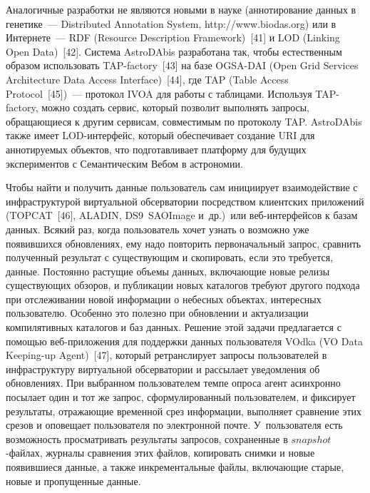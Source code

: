 \begin{multicols}{2}
      Аналогичные разработки не являются новыми в науке (аннотирование данных в 
генетике~--- {Distributed Annotation System}, {\sf http://www.biodas.org}) или в 
Интернете~--- RDF ({Resource Description Framework})~[41] и LOD ({Linking 
Open Data})~[42]. Сис\-те\-ма AstroDAbis разработана так, чтобы естественным образом 
использовать TAP-factory~[43] на базе OGSA-DAI ({Open Grid Services 
Architecture Data Access Interface})~[44], где TAP ({Table Access Protocol}~[45])~--- 
протокол IVOA для работы с таб\-ли\-ца\-ми. Используя TAP-factory, можно создать 
сервис, который позволит выполнять запросы, об\-ра\-ща\-ющи\-еся к другим сервисам, 
совместимым по протоколу TAP. AstroDAbis также имеет LOD-ин\-тер\-фейс, который 
обеспечивает создание URI для аннотируемых объектов, что подготавливает платформу 
для будущих экспериментов с Семантическим Вебом в астрономии. 
      
      Чтобы найти и получить данные пользователь сам инициирует взаимодействие с 
инфраструктурой виртуальной обсерватории посредством клиентских приложений 
(TOPCAT~[46], ALADIN, DS9\ SAOImage и~др.)\ или веб-ин\-тер\-фей\-сов к базам данных. 
Всякий раз, когда пользователь хочет узнать о возможно уже появившихся обновлениях, ему 
надо повторить первоначальный запрос, сравнить полученный результат с существующим и 
скопировать, если это требуется, данные. Постоянно растущие объемы данных, включающие 
новые релизы существующих обзоров, и публикации новых каталогов требуют другого 
подхода при отслеживании новой информации о небесных объектах, интересных 
пользователю. Особенно это полезно при обновлении и актуализации компилятивных 
каталогов и баз данных. Решение этой задачи предлагается с по\-мощью веб-при\-ло\-же\-ния для 
поддержки данных пользователя \mbox{VOdka} ({VO Data Keeping-up Agent})~[47], который 
ретранслирует запросы пользователей в инфраструктуру виртуальной обсерватории и 
рассылает уведомления об обновлениях. При выбранном пользователем темпе опроса агент 
асинхронно посылает один и тот же запрос, сформулированный пользователем, и фиксирует 
результаты, отражающие временной срез информации, выполняет сравнение этих срезов и 
оповещает пользователя по электронной почте. У~пользователя есть возможность 
просматривать результаты запросов, сохраненные в $snapshot$-фай\-лах, журналы сравнения 
этих файлов, копировать снимки и новые появившиеся данные, а также инкрементальные 
файлы, включающие старые, новые и пропущенные данные.
      

\end{multicols}
